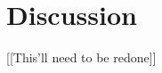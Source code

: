 \documentclass[12pt]{article}
\begin{document}
\section*{Discussion}

[[This'll need to be redone]]




\end{document}
